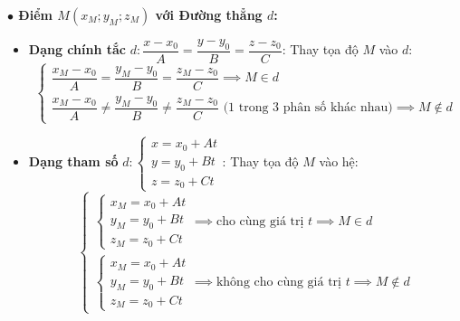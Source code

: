 \documentclass[12pt,a4paper]{article}
\begin{document}
\begin{theorybox}
    \textbf{\textcolor{amberorange}{$\bullet$ Điểm $M(x_M; y_M; z_M)$ với Đường thẳng $d$:}}
    \begin{itemize}
        \item \textbf{Dạng chính tắc } $d\colon \dfrac{x - x_0}{A} = \dfrac{y - y_0}{B} = \dfrac{z - z_0}{C}$: Thay tọa độ $M$ vào $d$:
        \[
            \begin{cases}
                \dfrac{x_M - x_0}{A} = \dfrac{y_M - y_0}{B} = \dfrac{z_M - z_0}{C} \implies M \in d \\[8pt]
                \dfrac{x_M - x_0}{A} \neq \dfrac{y_M - y_0}{B} \neq \dfrac{z_M - z_0}{C} \text{ (1 trong 3 phân số khác nhau)} \implies M \notin d
            \end{cases}
        \]
        \item \textbf{Dạng tham số } $d\colon \begin{cases} x = x_0 + At \\ y = y_0 + Bt \\ z = z_0 + Ct \end{cases}$: Thay tọa độ $M$ vào hệ:
        \[
            \begin{cases}
                \begin{cases} x_M = x_0 + At \\ y_M = y_0 + Bt \\ z_M = z_0 + Ct \end{cases} \implies \text{cho cùng giá trị } t \implies M \in d \\[14pt]
                \begin{cases} x_M = x_0 + At \\ y_M = y_0 + Bt \\ z_M = z_0 + Ct \end{cases} \implies \text{không cho cùng giá trị } t \implies M \notin d
            \end{cases}
        \]
    \end{itemize}
\end{theorybox}

\vspace{0.25cm}



\end{document}
